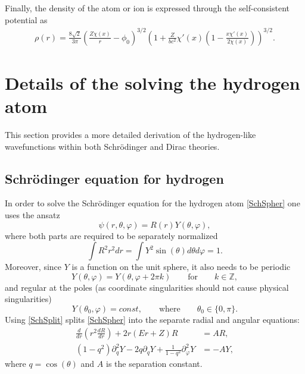 Finally, the density of the atom or ion is expressed through the
self-consistent potential as
  \begin{align}
    \rho(r) = \frac{8\sqrt{2}}{3\pi} \left(\frac{Z
    \chi(x)}{r} - \phi_{0}\right)^{3/2} \left(1 +
    \frac{Z}{b c^{2}}
    \chi'(x) \left(1 - \frac{x
    \chi'(x)}{2\chi(x)}\right)\right)^{3/2}. \label{eq:27}
  \end{align}

\section{Details of the solving the hydrogen atom}
\label{app:hydrogen}

This section provides a more detailed derivation of the hydrogen-like wavefunctions within both Schr\"odinger and Dirac theories.

\subsection{Schr\"odinger equation for hydrogen}

In order to solve the Schr\"odinger equation for the hydrogen atom \eqref{SchSpher} one uses the ansatz
\begin{equation}
	\psi(r,\theta,\varphi) = R(r)Y(\theta,\varphi), \label{SchSplit}
\end{equation}
where both parts are required to be separately normalized
\begin{equation}
	\int R^2 r^2 dr = \int Y^2 \sin(\theta)d\theta d\varphi=1. \label{RYnorm}
\end{equation}
Moreover, since $Y$ is a function on the unit sphere, it also needs to be periodic
\begin{equation}
	Y(\theta,\varphi)=Y(\theta,\varphi+2\pi k)\qquad \text{for} \qquad k \in \mathbb{Z},
\end{equation}
and regular at the poles (as coordinate singularities should not cause physical singularities)
\begin{equation} \label{Ycondition}
	Y(\theta_0,\varphi)=const, \qquad \text{where} \qquad \theta_0 \in\{0,\pi\}.
\end{equation}
Using \eqref{SchSplit} splits \eqref{SchSpher} into the separate radial and angular equations:
\begin{align} \label{Req}
	\frac{d}{dr}\left(r^2 \frac{d R}{d r}\right)+2r(E r+Z)R &= A R, \\
	(1-q^2) \partial_{q}^2 Y - 2q \partial_qY+\frac{1}{1-q^2} \partial^2_{\varphi} Y &= -A Y,\label{Yeq}
\end{align}
where $q = \cos(\theta)$ and $A$ is the separation constant.

